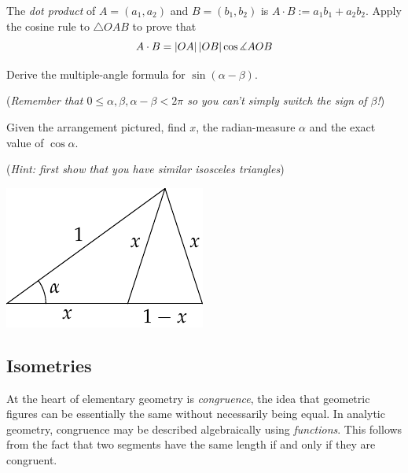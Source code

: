 \begin{exercises}{}{}
\begin{enumerate}
		\item The \emph{dot product} of $A=(a_1,a_2)$ and $B=(b_1,b_2)$ is $A\cdot B:=a_1b_1+a_2b_2$. Apply the cosine rule to $\triangle OAB$ to prove that
		\[
			A\cdot B=\left| OA\right|\left| OB\right|\cos\measuredangle AOB
		\]
		
		
		\item Derive the multiple-angle formula for $\sin(\alpha-\beta)$.\par
		(\emph{Remember that $0\le \alpha,\beta, \alpha-\beta<2\pi$ so you can't simply switch the sign of $\beta$!})
		
		
		\begin{minipage}[t]{0.7\linewidth}\vspace{0pt}
			\item Given the arrangement pictured, find $x$, the radian-measure $\alpha$ and the exact value of $\cos\alpha$.\par
			(\emph{Hint: first show that you have similar isosceles triangles})	
		\end{minipage}
		\hfill
		\begin{minipage}[t]{0.29\linewidth}\vspace{0pt}
			\flushright\includegraphics[scale=0.9]{angles-sin36}
		\end{minipage}
	\end{enumerate}
\end{exercises}

\clearpage



\subsection{Isometries}\label{sec:klein}

At the heart of elementary geometry is \emph{congruence}, the idea that geometric figures can be essentially the same without necessarily being equal. In analytic geometry, congruence may be described algebraically using \emph{functions}. This follows from the fact that two segments have the same length if and only if they are congruent.

